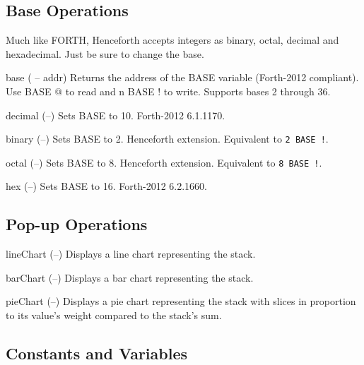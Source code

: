 \documentclass[a4paper, 11pt, openany]{book}
\begin{document}
\subsection{Base Operations}

Much like FORTH, Henceforth accepts integers as binary, octal, decimal and hexadecimal. Just be sure to change the base.

\begin{forthbox}
  base      ( -- addr)
            Returns the address of the BASE variable (Forth-2012
            compliant). Use BASE @ to read and n BASE ! to write.
            Supports bases 2 through 36.

  decimal   (--)
            Sets BASE to 10. Forth-2012 6.1.1170.

  binary    (--)
            Sets BASE to 2. Henceforth extension. Equivalent to
            \texttt{2 BASE !}.

  octal     (--)
            Sets BASE to 8. Henceforth extension. Equivalent to
            \texttt{8 BASE !}.

  hex       (--)
            Sets BASE to 16. Forth-2012 6.2.1660.
\end{forthbox}

\subsection{Pop-up Operations}

\begin{forthbox}
  lineChart    (--)
               Displays a line chart representing the stack.

  barChart     (--)
               Displays a bar chart representing the stack.

  pieChart     (--)
               Displays a pie chart representing the stack with
               slices in proportion to its value's weight compared
               to the stack's sum.
\end{forthbox}

\subsection{Constants and Variables}
\end{document}
